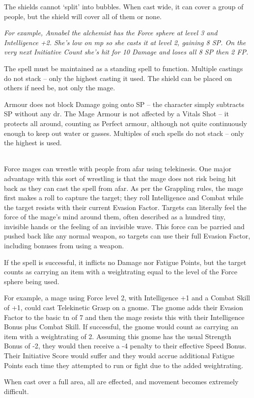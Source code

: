 \begin{multicols}{2}
The shields cannot `split' into bubbles.
When cast wide, it can cover a group of people, but the shield will cover all of them or none.

\textit{For example, Annabel the alchemist has the Force sphere at level 3 and Intelligence +2.
She's low on \gls{mp} so she casts it at level 2, gaining 8 \gls{SP}.
On the very next Initiative Count she's hit for 10 Damage and loses all 8 \gls{SP} then 2 FP.}

The spell must be maintained as a standing spell to function. Multiple castings do not stack -- only the highest casting it used. The shield can be placed on others if need be, not only the mage.

Armour does not block Damage going onto \gls{SP} -- the character simply subtracts \gls{SP} without any \gls{dr}. The Mage Armour is not affected by a Vitals Shot -- it protects all around, counting as Perfect armour, although not quite continuously enough to keep out water or gasses. Multiples of such spells do not stack -- only the highest is used.

\spelllevel

\\
Force mages can wrestle with people from afar using telekinesis. One major advantage with this sort of wrestling is that the mage does not risk being hit back as they can cast the spell from afar. As per the Grappling rules, the mage first makes a roll to capture the target; they roll Intelligence and Combat while the target resists with their current Evasion Factor. Targets can literally feel the force of the mage's mind around them, often described as a hundred tiny, invisible hands or the feeling of an invisible wave. This force can be parried and pushed back like any normal weapon, so targets can use their full Evasion Factor, including bonuses from using a weapon.

If the spell is successful, it inflicts no Damage nor Fatigue Points, but the target counts as carrying an item with a \gls{weightrating} equal to the level of the Force sphere being used.

For example, a mage using Force level 2, with Intelligence +1 and a Combat Skill of +1, could cast Telekinetic Grasp on a gnome.
The gnome adds their Evasion Factor to the basic \gls{tn} of 7 and then the mage resists this with their Intelligence Bonus plus Combat Skill.
If successful, the gnome would count as carrying an item with a \gls{weightrating} of 2.
Assuming this gnome has the usual Strength Bonus of -2, they would then receive a -4 penalty to their effective Speed Bonus.
Their Initiative Score would suffer and they would accrue additional Fatigue Points each time they attempted to run or fight due to the added \gls{weightrating}.

When cast over a full area, all are effected, and movement becomes extremely difficult.



\end{multicols}

